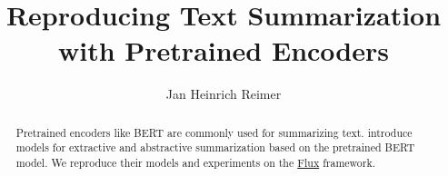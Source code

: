 \documentclass[english,sigconf,nonacm,natbib=false,balance=false,screen,review]{acmart}
\title{Reproducing Text Summarization with Pretrained Encoders}
\author{Jan Heinrich Reimer}
\affiliation{
    \institution{Martin Luther University Halle-Wittenberg}
    \streetaddress{Von-Seckendorff-Platz~1}
    \postcode{06108}
    \city{Halle (Saale)}
    \country{Germany}
}
\begin{document}
\begin{abstract}
    Pretrained encoders like BERT are commonly used for summarizing text. \citeauthor{DBLP:conf/emnlp/LiuL19} introduce models for extractive and abstractive summarization based on the pretrained BERT model.
    We reproduce their models and experiments on the \href{https://fluxml.ai/}{Flux} framework.
\end{abstract}

\maketitle






\printbibliography
\end{document}
